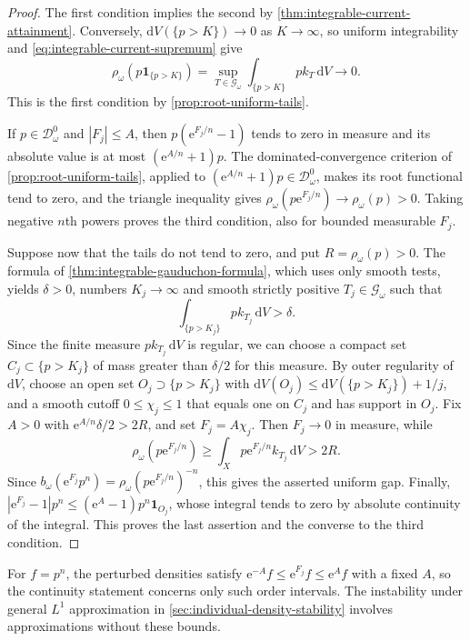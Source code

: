 \begin{proof}
The first condition implies the second by \cref{thm:integrable-current-attainment}. Conversely, $\mathrm{d}V(\{p>K\})\to0$ as $K\to\infty$, so uniform integrability and \eqref{eq:integrable-current-supremum} give
\[
 \rho_\omega(p\mathbf1_{\{p>K\}})
 =\sup_{T\in\mathscr G_\omega}\int_{\{p>K\}}p k_T\,\mathrm{d}V
 \longrightarrow0.
\]
This is the first condition by \cref{prop:root-uniform-tails}.

If $p\in\mathcal D_\omega^0$ and $|F_j|\leq A$, then $p(\mathrm{e}^{F_j/n}-1)$ tends to zero in measure and its absolute value is at most $(\mathrm{e}^{A/n}+1)p$. The dominated-convergence criterion of \cref{prop:root-uniform-tails}, applied to $(\mathrm{e}^{A/n}+1)p\in\mathcal D_\omega^0$, makes its root functional tend to zero, and the triangle inequality gives $\rho_\omega(p\mathrm{e}^{F_j/n})\to\rho_\omega(p)>0$. Taking negative $n$th powers proves the third condition, also for bounded measurable $F_j$.

Suppose now that the tails do not tend to zero, and put $R=\rho_\omega(p)>0$. The formula of \cref{thm:integrable-gauduchon-formula}, which uses only smooth tests, yields $\delta>0$, numbers $K_j\to\infty$ and smooth strictly positive $T_j\in\mathscr G_\omega$ such that
\[
 \int_{\{p>K_j\}}p k_{T_j}\,\mathrm{d}V>\delta.
\]
Since the finite measure $p k_{T_j}\,\mathrm{d}V$ is regular, we can choose a compact set $C_j\subset\{p>K_j\}$ of mass greater than $\delta/2$ for this measure. By outer regularity of $\mathrm{d}V$, choose an open set $O_j\supset\{p>K_j\}$ with
$\mathrm{d}V(O_j)\leq\mathrm{d}V(\{p>K_j\})+1/j$, and a smooth cutoff $0\leq\chi_j\leq1$ that equals one on $C_j$ and has support in $O_j$. Fix $A>0$ with $\mathrm{e}^{A/n}\delta/2>2R$, and set $F_j=A\chi_j$. Then $F_j\to0$ in measure, while
\[
 \rho_\omega(p\mathrm{e}^{F_j/n})
 \geq\int_Xp\mathrm{e}^{F_j/n}k_{T_j}\,\mathrm{d}V
 >2R.
\]
Since $b_\omega(\mathrm{e}^{F_j}p^n)=\rho_\omega(p\mathrm{e}^{F_j/n})^{-n}$, this gives the asserted uniform gap. Finally,
$|\mathrm{e}^{F_j}-1|p^n\leq(\mathrm{e}^A-1)p^n\mathbf1_{O_j}$, whose integral tends to zero by absolute continuity of the integral. This proves the last assertion and the converse to the third condition.
\end{proof}

For $f=p^n$, the perturbed densities satisfy $\mathrm{e}^{-A}f\leq\mathrm{e}^{F_j}f\leq\mathrm{e}^Af$ with a fixed $A$, so the continuity statement concerns only such order intervals. The instability under general $L^1$ approximation in \cref{sec:individual-density-stability} involves approximations without these bounds.

